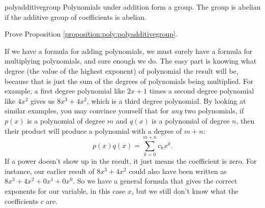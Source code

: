\begin {prop}{polyadditivegroup} Polynomials under addition form a group. The group is abelian if the additive group of coefficients is abelian.
\end{prop}

\begin{exercise}
Prove Proposition \ref{proposition:poly:polyadditivegroup}.
\end{exercise}

If we have a formula for adding polynomials, we must surely have a formula for multiplying polynomials, and sure enough we do.  The easy part is knowing what degree (the value of the highest exponent) of polynomial the result will be, because that is just the sum of the degrees of polynomials being multiplied. For example, a first degree polynomial like $2x+1$ times a second degree polynomial like $4x^2$ gives us $8x^3+4x^2$, which is a third degree polynomial.  By looking at similar examples, you may convince yourself that for \emph{any} two polynomials, if $p(x)$ is a polynomial of degree $m$ and $q(x)$ is a polynomial of degree $n$, then their product will produce a polynomial with a degree of $m+n$:
\[
p(x) q(x) = \sum_{k=0}^{m+n} c_k x^k.
\]
If a power doesn't show up in the result, it just means the coefficient is zero.  For instance, our earlier result of $8x^3+4x^2$ could also have been written as $8x^3+4x^2 + 0x^1 + 0x^0$.  So we have a general formula that gives the correct exponents for our variable, in this case $x$, but we still don't know what the coefficients $c$ are.
 
